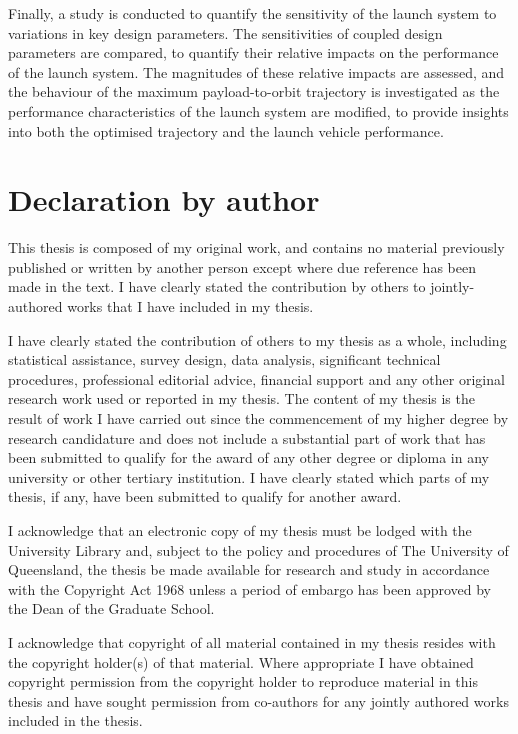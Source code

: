 Finally, a study is conducted to quantify the sensitivity of the launch system to variations in key design parameters. 
The sensitivities of coupled design parameters are compared, to quantify their relative impacts on the performance of the launch system. The magnitudes of these relative impacts are assessed, and the behaviour of the maximum payload-to-orbit trajectory is investigated as the performance characteristics of the launch system are modified, to provide insights into both the optimised trajectory and the launch vehicle performance. 

 

\clearpage
\section*{Declaration by author}
This thesis is composed of my original work, and contains no material previously published or written by another person except where due reference has been made in the text. I have clearly stated the contribution by others to jointly-authored works that I have included in my thesis.

I have clearly stated the contribution of others to my thesis as a whole, including statistical assistance, survey design, data analysis, significant technical procedures, professional editorial advice, financial support and any other original research work used or reported in my thesis. The content of my thesis is the result of work I have carried out since the commencement of my higher degree by research candidature and does not include a substantial part of work that has been submitted to qualify for the award of any other degree or diploma in any university or other tertiary institution. I have clearly stated which parts of my thesis, if any, have been submitted to qualify for another award.

I acknowledge that an electronic copy of my thesis must be lodged with the University Library and, subject to the policy and procedures of The University of Queensland, the thesis be made available for research and study in accordance with the Copyright Act 1968 unless a period of embargo has been approved by the Dean of the Graduate School. 

I acknowledge that copyright of all material contained in my thesis resides with the copyright holder(s) of that material. Where appropriate I have obtained copyright permission from the copyright holder to reproduce material in this thesis and have sought permission from co-authors for any jointly authored works included in the thesis.


